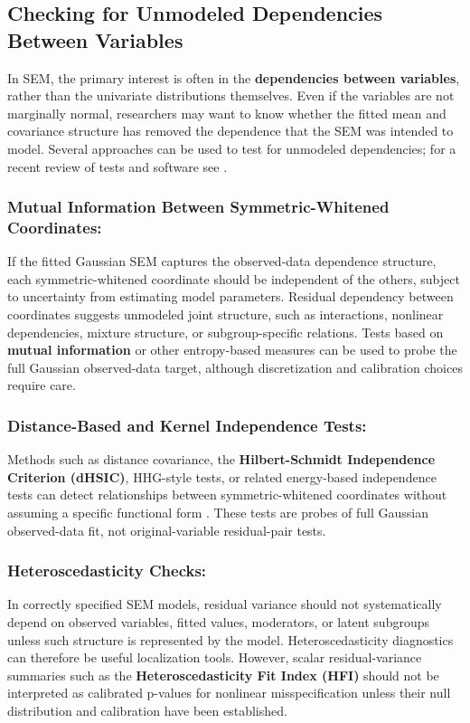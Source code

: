 \documentclass[floatsintext,a4paper]{apa7} %
\begin{document}
	\subsection{Checking for Unmodeled Dependencies Between Variables}
	In SEM, the primary interest is often in the \textbf{dependencies between variables}, rather than the univariate distributions themselves. Even if the variables are not marginally normal, researchers may want to know whether the fitted mean and covariance structure has removed the dependence that the SEM was intended to model. Several approaches can be used to test for unmodeled dependencies; for a recent review of tests and software see \citet{karch2024pearsons}.
	
\subsubsection{Mutual Information Between Symmetric-Whitened Coordinates:} If the fitted Gaussian SEM captures the observed-data dependence structure, each symmetric-whitened coordinate should be independent of the others, subject to uncertainty from estimating model parameters. Residual dependency between coordinates suggests unmodeled joint structure, such as interactions, nonlinear dependencies, mixture structure, or subgroup-specific relations. Tests based on \textbf{mutual information} or other entropy-based measures can be used to probe the full Gaussian observed-data target, although discretization and calibration choices require care.
	
\subsubsection{Distance-Based and Kernel Independence Tests:} Methods such as distance covariance, the \textbf{Hilbert-Schmidt Independence Criterion (dHSIC)}, HHG-style tests, or related energy-based independence tests can detect relationships between symmetric-whitened coordinates without assuming a specific functional form \citep{rizzo2016energy,pfister2018kernelbased,karch2024pearsons}. These tests are probes of full Gaussian observed-data fit, not original-variable residual-pair tests.
	
	\subsubsection{Heteroscedasticity Checks:} In correctly specified SEM models, residual variance should not systematically depend on observed variables, fitted values, moderators, or latent subgroups unless such structure is represented by the model. Heteroscedasticity diagnostics can therefore be useful localization tools. However, scalar residual-variance summaries such as the \textbf{Heteroscedasticity Fit Index (HFI)} \citep{gerhard2017fit} should not be interpreted as calibrated p-values for nonlinear misspecification unless their null distribution and calibration have been established.
	
\end{document}
